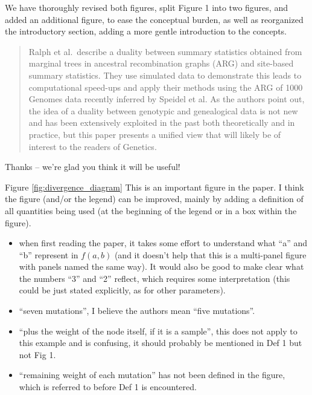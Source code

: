 We have thoroughly revised both figures, split Figure 1 into two figures,
and added an additional figure,
to ease the conceptual burden,
as well as reorganized the introductory section,
adding a more gentle introduction to the concepts.




\begin{quote}
Ralph et al.\ describe a duality between summary statistics obtained from marginal trees in ancestral recombination graphs (ARG) and site-based summary statistics.
They use simulated data to demonstrate this leads to computational speed-ups and apply their methods using the ARG of 1000 Genomes data recently inferred by Speidel et al.
As the authors point out, the idea of a duality between genotypic and genealogical data is not new and has been extensively exploited in the past both theoretically and in practice,
but this paper presents a unified view that will likely be of interest to the readers of Genetics.
\end{quote}

Thanks -- we're glad you think it will be useful!

\begin{point}{Figure \ref{fig:divergence_diagram}}
    This is an important figure in the paper. I think the figure (and/or the legend) can be improved, mainly by adding a definition of all quantities being used (at the beginning of the legend or in a box within the figure).
    \begin{itemize}
        \item when first reading the paper, it takes some effort to understand what ``a'' and ``b'' represent in $f(a,b)$
            (and it doesn't help that this is a multi-panel figure with panels named the same way).
            It would also be good to make clear what the numbers ``3'' and ``2'' reflect, which requires some interpretation (this could be just stated explicitly, as for other parameters).
        \item ``seven mutations'', I believe the authors mean ``five mutations''.
        \item ``plus the weight of the node itself, if it is a sample'', this does not apply to this example and is confusing, it should probably be mentioned in Def 1 but not Fig 1.
        \item ``remaining weight of each mutation'' has not been defined in the figure, which is referred to before Def 1 is encountered.
    \end{itemize}
\end{point}

